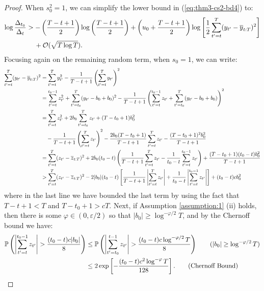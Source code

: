 \documentclass{article}
\begin{document}
\begin{proof}
When $s_0^2 = 1$, we can simplify the lower bound in (\ref{eq:thm3-cs2-bd4}) to:
\begin{align}
    \log \frac{\Delta_{t_0}}{\Delta_t} &> - \left(\frac{T - t + 1}{2}\right) \log\left(\frac{T-t+1}{2}\right) + \left(u_0 + \frac{T - t +1}{2}\right)\log\left[ \frac{1}{2}\sum_{t'=t}^T (y_{t'} - \overline{y}_{t:T})^2 \right] \notag \\
    &\quad\: +  \mathcal{O}(\sqrt{T \log T}). \label{eq:thm3-cs2-bd7}
\end{align}
Focusing again on the remaining random term, when $s_0 = 1$, we can write:
\small
\begin{align}
    \sum_{t'=t}^T (y_{t'} - \overline{y}_{t:T})^2 &= \sum_{t'=t}^T y^2_{t'} - \frac{1}{T-t+1}\left(\sum_{t'=t}^T y_{t'} \right)^2 \notag \\
    &= \sum_{t'=t}^{t_0-1} z^2_{t'} + \sum_{t'=t_0}^T (y_{t'} - b_0 + b_0)^2 - \frac{1}{T-t+1}\left(\sum_{t'=t}^{t_0-1} z_{t'} + \sum_{t'=t_0}^T (y_{t'} - b_0 + b_0)\right)^2 \notag \\
    &= \sum_{t'=t}^T z^2_{t'} + 2b_0\sum_{t'=t_0}^T z_{t'} + (T - t_0 + 1)b_0^2 \notag \\
    &\quad - \frac{1}{T-t+1}\left(\sum_{t'=t}^T z_{t'} \right)^2  - \frac{2b_0(T-t_0+1)}{T-t+1}\sum_{t'=t}^T z_{t'} - \frac{(T-t_0+1)^2b_0^2}{T-t+1} \notag \\
    &=  \sum_{t'=t}^T (z_{t'} - \overline{z}_{t:T})^2 + 2b_0(t_0-t)\left(\frac{1}{T-t+1} \sum_{t'=t}^T z_{t'} - \frac{1}{t_0-t}\sum_{t' = t}^{t_0 - 1} z_{t'}\right) + \frac{(T-t_0+1)(t_0-t)b_0^2}{T-t+1} \notag \\
    &> \sum_{t'=t}^T (z_{t'} - \overline{z}_{t:T})^2 - 2|b_0|(t_0-t)\left[\frac{1}{T-t+1} \left|\sum_{t'=t}^T z_{t'}\right| + \frac{1}{t_0-t}\left|\sum_{t' = t}^{t_0 - 1} z_{t'}\right|\right] + (t_0-t)cb_0^2 \label{eq:thm3-cs2-bd8}
\end{align}
\normalsize
where in the last line we have bounded the last term by using the fact that $T-t+1 < T$ and $T-t_0 + 1 > cT$. Next, if Assumption \ref{assumption:1} (ii) holds, then there is some $\varphi \in (0, \varepsilon/2)$ so that $|b_0| \geq \log^{-\varphi/2}T$, and by the Chernoff bound we have:
\begin{align*}
    \mathbb{P}\left(\left|\sum_{t'=t}^{t_0-1} z_{t'}\right| > \frac{(t_0-t) c|b_0|}{8}\right) &\leq \mathbb{P}\left(\left|\sum_{t'=t_0}^{t-1} z_{t'}\right| > \frac{(t_0-t) c\log^{-\varphi/2}T}{8}\right) \tag{$|b_0| \geq \log^{-\varphi/2}T$} \\
    &\leq 2 \exp\left[- \frac{(t_0-t)c^2\log^{-\varphi}T}{128}\right]. \tag{Chernoff Bound}

\end{align*}
\end{proof}
\end{document}
